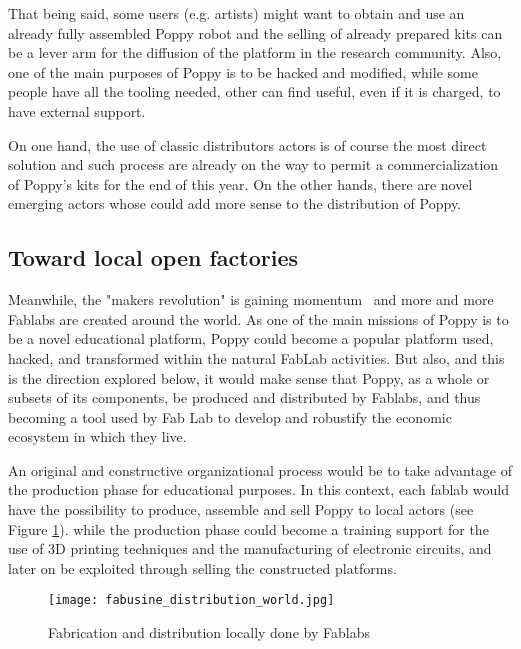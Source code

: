 That being said, some users (e.g. artists) might want to obtain and use an already fully assembled Poppy robot and the selling of already prepared kits can be a lever arm for the diffusion of the platform in the research community.
Also, one of the main purposes of Poppy is to be hacked and modified, while some people have all the tooling needed, other can find useful, even if it is charged, to have external support.

On one hand, the use of classic distributors actors is of course the most direct solution and such process are already on the way to permit a commercialization of Poppy's kits for the end of this year. On the other hands, there are novel emerging actors whose could add more sense to the distribution of Poppy.


\subsection{Toward local open factories} %

Meanwhile, the "makers revolution" is gaining momentum~\parencite{anderson2012makers} and more and more Fablabs are created around the world. As one of the main missions of Poppy is to be a novel educational platform, Poppy could become a popular platform used, hacked, and transformed within the natural FabLab activities. But also, and this is the direction explored below,  it would make sense that Poppy, as a whole or subsets of its components, be produced and distributed by Fablabs, and thus becoming a tool used by Fab Lab to develop and robustify the economic ecosystem in which they live.

An original and constructive organizational process would be to take advantage of the production phase for educational purposes. In this context, each fablab would have the possibility to produce, assemble and sell Poppy to local actors (see Figure \ref{fig:world_fab}). while the production phase could become a training support for the use of 3D printing techniques and the manufacturing of electronic circuits, and later on be exploited through selling the constructed platforms.

\begin{figure}[tb]
    \begin{center}
        \texttt{[image: fabusine\_distribution\_world.jpg]}
    \end{center}
    \caption{Fabrication and distribution locally done by Fablabs}
    \label{fig:world_fab}
\end{figure}


